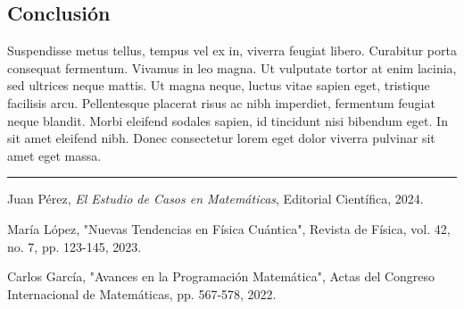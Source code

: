 \documentclass[a4paper, 10pt]{article}
\begin{document}
\begin{multicols}{2}
		\section{Conclusión}
		Suspendisse metus tellus, tempus vel ex in, viverra feugiat libero. Curabitur porta consequat fermentum. Vivamus in leo magna. Ut vulputate tortor at enim lacinia, sed ultrices neque mattis. Ut magna neque, luctus vitae sapien eget, tristique facilisis arcu. Pellentesque placerat risus ac nibh imperdiet, fermentum feugiat neque blandit. Morbi eleifend sodales sapien, id tincidunt nisi bibendum eget. In sit amet eleifend nibh. Donec consectetur lorem eget dolor viverra pulvinar sit amet eget massa.
	\end{multicols}
	
	\vspace{1em} %
	\hrule %
	\vspace{1em} %
	
	\renewcommand{\refname}{Referencias} %
	\begin{thebibliography}{9}
		Juan Pérez,
		\textit{El Estudio de Casos en Matemáticas},
		Editorial Científica, 2024.
		
		María López,
		"Nuevas Tendencias en Física Cuántica",
		Revista de Física, vol. 42, no. 7, pp. 123-145, 2023.
		
		Carlos García,
		"Avances en la Programación Matemática",
		Actas del Congreso Internacional de Matemáticas, pp. 567-578, 2022.
	\end{thebibliography}
	
\end{document}
